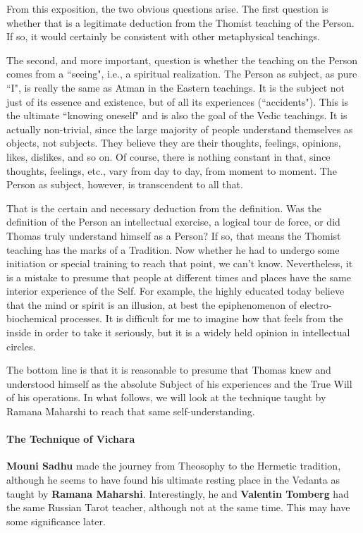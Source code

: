 From this exposition, the two obvious questions arise. The first question is whether that is a legitimate deduction from the Thomist teaching of the Person. If so, it would certainly be consistent with other metaphysical teachings.

The second, and more important, question is whether the teaching on the Person comes from a ``seeing", i.e., a spiritual realization. The Person as subject, as pure ``I", is really the same as Atman in the Eastern teachings. It is the subject not just of its essence and existence, but of all its experiences (``accidents"). This is the ultimate ``knowing oneself" and is also the goal of the Vedic teachings. It is actually non-trivial, since the large majority of people understand themselves as objects, not subjects. They believe they are their thoughts, feelings, opinions, likes, dislikes, and so on. Of course, there is nothing constant in that, since thoughts, feelings, etc., vary from day to day, from moment to moment. The Person as subject, however, is transcendent to all that.

That is the certain and necessary deduction from the definition. Was the definition of the Person an intellectual exercise, a logical tour de force, or did Thomas truly understand himself as a Person? If so, that means the Thomist teaching has the marks of a Tradition. Now whether he had to undergo some initiation or special training to reach that point, we can't know. Nevertheless, it is a mistake to presume that people at different times and places have the same interior experience of the Self. For example, the highly educated today believe that the mind or spirit is an illusion, at best the epiphenomenon of electro-biochemical processes. It is difficult for me to imagine how that feels from the inside in order to take it seriously, but it is a widely held opinion in intellectual circles.

The bottom line is that it is reasonable to presume that Thomas knew and understood himself as the absolute Subject of his experiences and the True Will of his operations. In what follows, we will look at the technique taught by Ramana Maharshi to reach that same self-understanding.


\hfill

\paragraph{The Technique of Vichara}
\textbf{Mouni Sadhu} made the journey from Theosophy to the Hermetic tradition, although he seems to have found his ultimate resting place in the Vedanta as taught by \textbf{Ramana Maharshi}. Interestingly, he and \textbf{Valentin Tomberg} had the same Russian Tarot teacher, although not at the same time. This may have some significance later.

